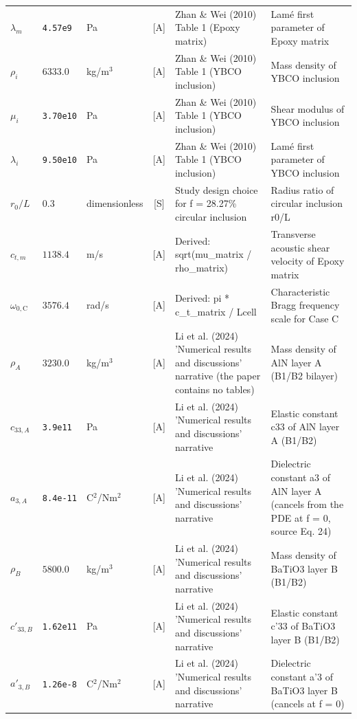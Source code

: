 \begin{xltabular}{\textwidth}{@{}l >{\raggedright\arraybackslash}p{2.2cm} >{\raggedright\arraybackslash}p{2.4cm} c L{2.6cm} Y@{}}
$\lambda_m$ & \texttt{4.57e9} & Pa & [A] & Zhan \& Wei (2010) Table 1 (Epoxy matrix) & Lamé first parameter of Epoxy matrix \\
$\rho_i$ & $6333.0$ & kg/m$^3$ & [A] & Zhan \& Wei (2010) Table 1 (YBCO inclusion) & Mass density of YBCO inclusion \\
$\mu_i$ & \texttt{3.70e10} & Pa & [A] & Zhan \& Wei (2010) Table 1 (YBCO inclusion) & Shear modulus of YBCO inclusion \\
$\lambda_i$ & \texttt{9.50e10} & Pa & [A] & Zhan \& Wei (2010) Table 1 (YBCO inclusion) & Lamé first parameter of YBCO inclusion \\
$r_0/L$ & $0.3$ & dimensionless & [S] & Study design choice for f = 28.27\% circular inclusion & Radius ratio of circular inclusion r0/L \\
$c_{t,m}$ & $1138.4$ & m/s & [A] & Derived: sqrt(mu\_\hspace{0pt}matrix / rho\_\hspace{0pt}matrix) & Transverse acoustic shear velocity of Epoxy matrix \\
$\omega_{0,\mathrm{C}}$ & $3576.4$ & rad/s & [A] & Derived: pi * c\_\hspace{0pt}t\_\hspace{0pt}matrix / Lcell & Characteristic Bragg frequency scale for Case C \\
$\rho_A$ & $3230.0$ & kg/m$^3$ & [A] & Li et al. (2024) 'Numerical results and discussions' narrative (the paper contains no tables) & Mass density of AlN layer A (B1/B2 bilayer) \\
$c_{33,A}$ & \texttt{3.9e11} & Pa & [A] & Li et al. (2024) 'Numerical results and discussions' narrative & Elastic constant c33 of AlN layer A (B1/B2) \\
$a_{3,A}$ & \texttt{8.4e-11} & C$^2$/Nm$^2$ & [A] & Li et al. (2024) 'Numerical results and discussions' narrative & Dielectric constant a3 of AlN layer A (cancels from the PDE at f = 0, source Eq. 24) \\
$\rho_B$ & $5800.0$ & kg/m$^3$ & [A] & Li et al. (2024) 'Numerical results and discussions' narrative & Mass density of BaTiO3 layer B (B1/B2) \\
$c'_{33,B}$ & \texttt{1.62e11} & Pa & [A] & Li et al. (2024) 'Numerical results and discussions' narrative & Elastic constant c'33 of BaTiO3 layer B (B1/B2) \\
$a'_{3,B}$ & \texttt{1.26e-8} & C$^2$/Nm$^2$ & [A] & Li et al. (2024) 'Numerical results and discussions' narrative & Dielectric constant a'3 of BaTiO3 layer B (cancels at f = 0) \\

\end{xltabular}
